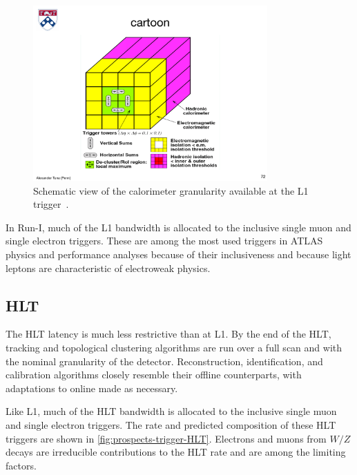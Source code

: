 \begin{figure}[tp]
  \centering
  \includegraphics[width=0.80\textwidth]{figures/trigger/cartoonL1}
  \caption{Schematic view of the calorimeter granularity available at the L1 trigger~\cite{1998.ATLAS-TDR-L1}.}
  \label{fig:prospects-trigger-cartoonL1}
\end{figure}

In Run-I, much of the L1 bandwidth is allocated to the inclusive single muon and single electron triggers. These are among the most used triggers in ATLAS physics and performance analyses because of their inclusiveness and because light leptons are characteristic of electroweak physics.

\subsection{HLT}

The HLT latency is much less restrictive than at L1. By the end of the HLT, tracking and topological clustering algorithms are run over a full scan and with the nominal granularity of the detector. Reconstruction, identification, and calibration algorithms closely resemble their offline counterparts, with adaptations to online made as necessary. 

Like L1, much of the HLT bandwidth is allocated to the inclusive single muon and single electron triggers. The rate and predicted composition of these HLT triggers are shown in \cref{fig:prospects-trigger-HLT}. Electrons and muons from $W/Z$ decays are irreducible contributions to the HLT rate and are among the limiting factors.

